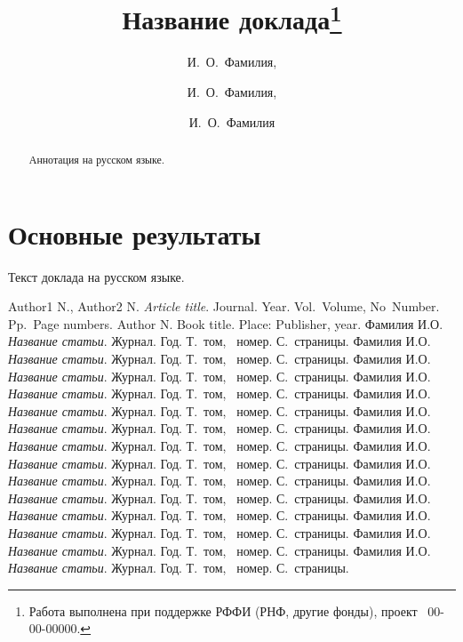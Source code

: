 \documentclass[12pt]{llncs}
\begin{document}

\title{Название доклада\thanks{Работа выполнена при поддержке РФФИ (РНФ, другие фонды), проект \textnumero~00-00-00000.}}
\author{И.~О.~Фамилия,
  \and
  И.~О.~Фамилия,
  \and
  И.~О.~Фамилия
} %

\maketitle

\begin{abstract}
Аннотация на русском языке.

\end{abstract}

\section{Основные результаты} %

Текст доклада на русском языке.




\begin{thebibliography}{99}
Author1 N., Author2 N.  {\it Article title}. Journal. Year. Vol.~Volume, No~Number. Pp.~Page numbers.
Author N. Book title. Place: Publisher, year.
 Фамилия И.О. {\it Название статьи}. Журнал. Год. Т.~том,  \textnumero~номер. С.~страницы.
 Фамилия И.О. {\it Название статьи}. Журнал. Год. Т.~том,  \textnumero~номер. С.~страницы.
 Фамилия И.О. {\it Название статьи}. Журнал. Год. Т.~том,  \textnumero~номер. С.~страницы.
 Фамилия И.О. {\it Название статьи}. Журнал. Год. Т.~том,  \textnumero~номер. С.~страницы.
 Фамилия И.О. {\it Название статьи}. Журнал. Год. Т.~том,  \textnumero~номер. С.~страницы.
 Фамилия И.О. {\it Название статьи}. Журнал. Год. Т.~том,  \textnumero~номер. С.~страницы.
 Фамилия И.О. {\it Название статьи}. Журнал. Год. Т.~том,  \textnumero~номер. С.~страницы.
 Фамилия И.О. {\it Название статьи}. Журнал. Год. Т.~том,  \textnumero~номер. С.~страницы.
 Фамилия И.О. {\it Название статьи}. Журнал. Год. Т.~том,  \textnumero~номер. С.~страницы.
 Фамилия И.О. {\it Название статьи}. Журнал. Год. Т.~том,  \textnumero~номер. С.~страницы.
 Фамилия И.О. {\it Название статьи}. Журнал. Год. Т.~том,  \textnumero~номер. С.~страницы.
 Фамилия И.О. {\it Название статьи}. Журнал. Год. Т.~том,  \textnumero~номер. С.~страницы.
 Фамилия И.О. {\it Название статьи}. Журнал. Год. Т.~том,  \textnumero~номер. С.~страницы.
 Фамилия И.О. {\it Название статьи}. Журнал. Год. Т.~том,  \textnumero~номер. С.~страницы.
\end{thebibliography}
\end{document}
